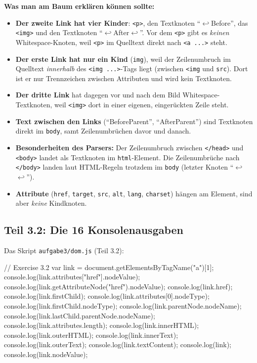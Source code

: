 \documentclass[a4paper,11pt]{article}
\newcommand{\nl}{\ensuremath{\hookleftarrow}}
\newcommand{\ws}{\textvisiblespace}
\begin{document}
\textbf{Was man am Baum erklären können sollte:}
\begin{itemize}
\item \textbf{Der zweite Link hat vier Kinder}: \texttt{<p>}, den Textknoten "`\nl\ws\ws\ws\ws Before\ws"', das
      \texttt{<img>} und den Textknoten "`\nl\ws\ws\ws\ws After\nl"'. Vor dem \texttt{<p>} gibt es \emph{keinen}
      Whitespace-Knoten, weil \texttt{<p>} im Quelltext direkt nach \texttt{<a ...>} steht.
\item \textbf{Der erste Link hat nur ein Kind} (\texttt{img}), weil der Zeilenumbruch im Quelltext \emph{innerhalb}
      des \texttt{<img ...>}-Tags liegt (zwischen \texttt{<img} und \texttt{src}). Dort ist er nur Trennzeichen
      zwischen Attributen und wird kein Textknoten.
\item \textbf{Der dritte Link} hat dagegen vor und nach dem Bild Whitespace-Textknoten, weil \texttt{<img>} dort
      in einer eigenen, eingerückten Zeile steht.
\item \textbf{Text zwischen den Links} ("`BeforeParent"', "`AfterParent"') sind Textknoten direkt im
      \texttt{body}, samt Zeilenumbrüchen davor und danach.
\item \textbf{Besonderheiten des Parsers:} Der Zeilenumbruch zwischen \texttt{</head>} und \texttt{<body>} landet als
      Textknoten im \texttt{html}-Element. Die Zeilenumbrüche nach \texttt{</body>} landen laut HTML-Regeln
      trotzdem im \texttt{body} (letzter Knoten "`\nl\nl"').
\item \textbf{Attribute} (\texttt{href}, \texttt{target}, \texttt{src}, \texttt{alt}, \texttt{lang}, \texttt{charset})
      hängen am Element, sind aber \emph{keine} Kindknoten.
\end{itemize}

\subsection{Teil 3.2: Die 16 Konsolenausgaben}

Das Skript \texttt{aufgabe3/dom.js} (Teil 3.2):
\begin{code}
// Exercise 3.2
var link = document.getElementsByTagName("a")[1];
console.log(link.attributes["href"].nodeValue);
console.log(link.getAttributeNode("href").nodeValue);
console.log(link.href);
console.log(link.firstChild);
console.log(link.attributes[0].nodeType);
console.log(link.firstChild.nodeType);
console.log(link.parentNode.nodeName);
console.log(link.lastChild.parentNode.nodeName);
console.log(link.attributes.length);
console.log(link.innerHTML);
console.log(link.outerHTML);
console.log(link.innerText);
console.log(link.outerText);
console.log(link.textContent);
console.log(link);
console.log(link.nodeValue);
\end{code}
\end{document}
